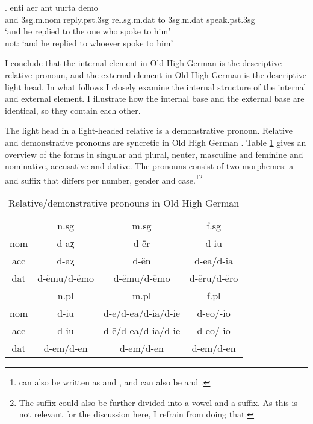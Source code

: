 \exg. enti aer {ant uurta} demo  \\
and 3\ac{sg}.\ac{m}.\ac{nom} reply.\ac{pst}.3\ac{sg}\scsub{[dat]} \ac{rel}.\ac{sg}.\ac{m}.\ac{dat} {to 3\ac{sg}.\ac{m}.\ac{dat}} speak.\ac{pst}.3\ac{sg}\scsub{[nom]}\\
`and he replied to the one who spoke to him'\\
not: `and he replied to whoever spoke to him'
 \label{ex:ohg-dat-nom-rep}

I conclude that the internal element in Old High German is the descriptive relative pronoun, and the external element in Old High German is the descriptive light head. In what follows I closely examine the internal structure of the internal and external element. I illustrate how the internal base and the external base are identical, so they contain each other.

The light head in a light-headed relative is a demonstrative pronoun. Relative and demonstrative pronouns are syncretic in Old High German . Table \ref{tbl:rel-dem-ohg} gives an overview of the forms in singular and plural, neuter, masculine and feminine and nominative, accusative and dative. The pronouns consist of two morphemes: a  and suffix that differs per number, gender and case.\footnote{
 can also be written as  and ,  and  can also be  and  .
}\footnote{
The suffix could also be further divided into a vowel and a suffix. As this is not relevant for the discussion here, I refrain from doing that.
}

\begin{table}[H]
 \center
 \caption {Relative/demonstrative pronouns in Old High German }
  \begin{tabular}{cccc}
  \toprule
            & \ac{n}.\ac{sg}  & \ac{m}.\ac{sg}      & \ac{f}.\ac{sg}    \\
        \cmidrule{2-4}
  \ac{nom}  & d-aȥ            & d-ër                & d-iu               \\
  \ac{acc}  & d-aȥ            & d-ën                & d-ea/d-ia         \\
  \ac{dat}  & d-ëmu/d-ëmo     & d-ëmu/d-ëmo         & d-ëru/d-ëro       \\
  \bottomrule
            & \ac{n}.\ac{pl}  & \ac{m}.\ac{pl}      &  \ac{f}.\ac{pl}  \\
        \cmidrule{2-4}
  \ac{nom}  & d-iu            &  d-ē/d-ea/d-ia/d-ie & d-eo/-io         \\
  \ac{acc}  & d-iu            &  d-ē/d-ea/d-ia/d-ie & d-eo/-io         \\
  \ac{dat}  & d-ēm/d-ēn       &  d-ēm/d-ēn          & d-ēm/d-ēn        \\
    \bottomrule
  \end{tabular}
  \label{tbl:rel-dem-ohg}
\end{table}

